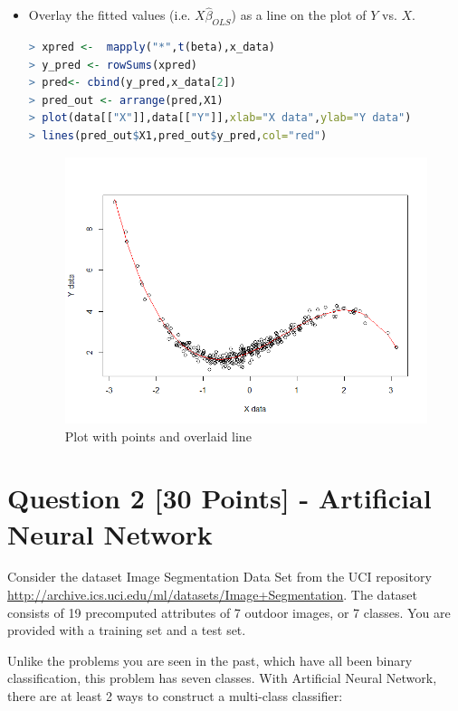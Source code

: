 \documentclass[fontsize=10pt,DIV=14]{scrartcl}
\begin{document}
\begin{enumerate}
\begin{itemize}
		\item
		Overlay the fitted values (i.e. $X\hat{\beta}_{OLS}$) as a line on the plot of $Y$ vs. $X$.
		\begin{lstlisting}[language=R,frame=single]
> xpred <-  mapply("*",t(beta),x_data)
> y_pred <- rowSums(xpred)
> pred<- cbind(y_pred,x_data[2])
> pred_out <- arrange(pred,X1)
> plot(data[["X"]],data[["Y"]],xlab="X data",ylab="Y data")
> lines(pred_out$X1,pred_out$y_pred,col="red")
		\end{lstlisting}
		\begin{figure}[H]
				\begin{center}
					\includegraphics[width=\textwidth]{resources/q1_2_img2.png}
					\caption{Plot with points and overlaid line}
				\end{center}
			\end{figure}
		\end{itemize}
	\end{enumerate}

	\section{Question 2 [30 Points] - Artificial Neural Network}

	Consider the dataset Image Segmentation Data Set from the UCI repository \url{http://archive.ics.uci.edu/ml/datasets/Image+Segmentation}. The dataset consists of 19 precomputed attributes of 7 outdoor images, or 7 classes. You are provided with a training set and a test set. 

	Unlike the problems you are seen in the past, which have all been binary classiﬁcation, this problem has seven classes. With Artiﬁcial Neural Network, there are at least 2 ways to construct a multi-class classiﬁer:
\end{document}
